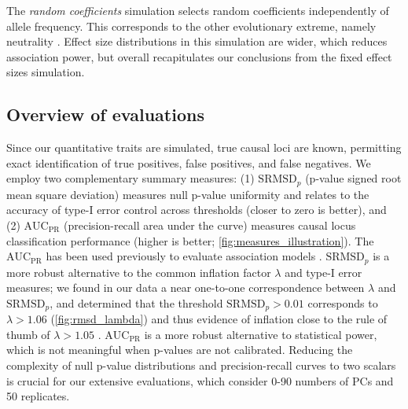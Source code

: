 \documentclass[11pt]{article}
\newcommand{\rmsd}{\text{SRMSD}_p}
\newcommand{\auc}{\text{AUC}_\text{PR}}
\begin{document}
The \textit{random coefficients} simulation selects random coefficients independently of allele frequency.
This corresponds to the other evolutionary extreme, namely neutrality \citep{simons_population_2018}.
Effect size distributions in this simulation are wider, which reduces association power, but overall recapitulates our conclusions from the fixed effect sizes simulation.

\subsection{Overview of evaluations}

Since our quantitative traits are simulated, true causal loci are known, permitting exact identification of true positives, false positives, and false negatives.
We employ two complementary summary measures:
(1) $\rmsd$ (p-value signed root mean square deviation) measures null p-value uniformity and relates to the accuracy of type-I error control across thresholds (closer to zero is better), and
(2) $\auc$ (precision-recall area under the curve) measures causal locus classification performance (higher is better; \cref{fig:measures_illustration}).
The $\auc$ has been used previously to evaluate association models \citep{rakitsch_lasso_2013}.
$\rmsd$ is a more robust alternative to the common inflation factor $\lambda$ and type-I error measures; we found in our data a near one-to-one correspondence between $\lambda$ and $\rmsd$, and determined that the threshold $\rmsd > 0.01$ corresponds to $\lambda > 1.06$ (\cref{fig:rmsd_lambda}) and thus evidence of inflation close to the rule of thumb of $\lambda > 1.05$ \citep{price_new_2010}.
$\auc$ is a more robust alternative to statistical power, which is not meaningful when p-values are not calibrated.
Reducing the complexity of null p-value distributions and precision-recall curves to two scalars is crucial for our extensive evaluations, which consider 0-90 numbers of PCs and 50 replicates.
\end{document}
